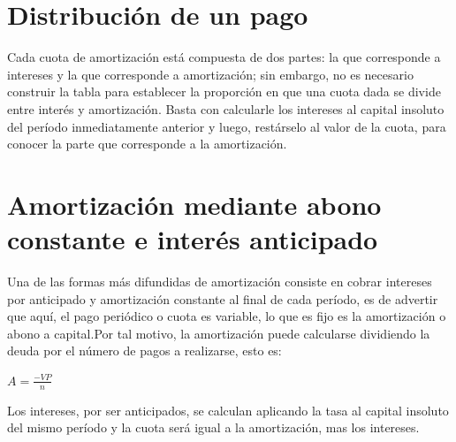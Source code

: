 	\section{Distribución de un pago}
	
	Cada cuota de amortización está compuesta de dos partes: la que corresponde a intereses y la que corresponde a amortización; sin embargo, no es necesario construir la tabla para establecer la proporción en que una cuota dada se divide entre interés y amortización. Basta con calcularle los intereses al capital insoluto del período inmediatamente anterior y luego, restárselo al valor de la cuota, para conocer la parte que corresponde a la amortización. \\
	
	
 
	
	
	\section{Amortización mediante abono constante e interés anticipado}
	
	Una de las formas más difundidas de amortización consiste en cobrar intereses por anticipado y amortización constante al final de cada período, es de advertir que aquí, el pago periódico o cuota es variable, lo que es fijo es la amortización o abono a capital.Por tal motivo, la amortización puede calcularse dividiendo la deuda por el número de pagos a realizarse, esto es:
	\begin{center}
		$A=\frac{-VP}{n}$
	\end{center}
	Los intereses, por ser anticipados, se calculan aplicando la tasa al capital insoluto del mismo período y la cuota será igual a la amortización, mas los intereses. \\
	
	
	
	

